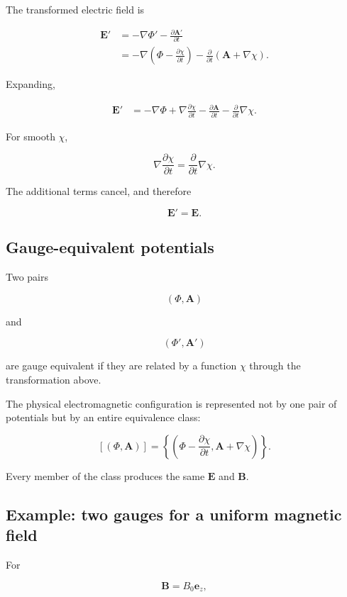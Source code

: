 The transformed electric field is

\[
\begin{aligned}
\mathbf{E}'
&=
-\nabla\Phi'
-
\frac{\partial\mathbf{A}'}{\partial t}\\
&=
-\nabla
\left(
\Phi-
\frac{\partial\chi}{\partial t}
\right)
-
\frac{\partial}{\partial t}
\left(
\mathbf{A}+
\nabla\chi
\right).
\end{aligned}
\]

Expanding,

\[
\begin{aligned}
\mathbf{E}'
&=
-\nabla\Phi
+
\nabla
\frac{\partial\chi}{\partial t}
-
\frac{\partial\mathbf{A}}{\partial t}
-
\frac{\partial}{\partial t}
\nabla\chi.
\end{aligned}
\]

For smooth \(\chi\),

\[
\nabla
\frac{\partial\chi}{\partial t}
=
\frac{\partial}{\partial t}
\nabla\chi.
\]

The additional terms cancel, and therefore

\[
\boxed{
\mathbf{E}'=\mathbf{E}
}.
\]

\subsection{Gauge-equivalent potentials}

Two pairs

\[
(\Phi,\mathbf{A})
\]

and

\[
(\Phi',\mathbf{A}')
\]

are gauge equivalent if they are related by a function \(\chi\) through the transformation above.

The physical electromagnetic configuration is represented not by one pair of potentials but by an entire equivalence class:

\[
\boxed{
[(\Phi,\mathbf{A})]
=
\left\{
\left(
\Phi-
\frac{\partial\chi}{\partial t},
\mathbf{A}+
\nabla\chi
\right)
\right\}
}.
\]

Every member of the class produces the same \(\mathbf{E}\) and \(\mathbf{B}\).

\subsection{Example: two gauges for a uniform magnetic field}

For

\[
\mathbf{B}=B_0\mathbf{e}_z,
\]

